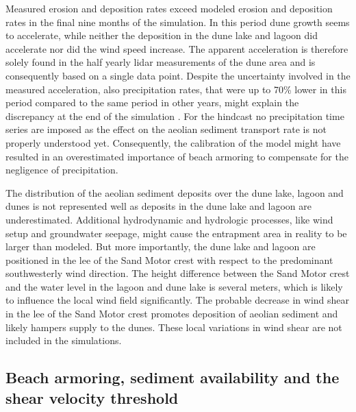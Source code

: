 Measured erosion and deposition rates exceed modeled erosion and
deposition rates in the final nine months of the simulation. In this
period dune growth seems to accelerate, while neither the deposition
in the dune lake and lagoon did accelerate nor did the wind speed
increase. The apparent acceleration is therefore solely found in the
half yearly lidar measurements of the dune area \citep{Hoonhout2017a}
and is consequently based on a single data point. Despite the
uncertainty involved in the measured acceleration, also precipitation
rates, that were up to 70\% lower in this period compared to the same
period in other years, might explain the discrepancy at the end of the
simulation \citep{Jackson1998}. For the hindcast no precipitation time
series are imposed as the effect on the aeolian sediment transport
rate is not properly understood yet. Consequently, the calibration of
the model might have resulted in an overestimated importance of beach
armoring to compensate for the negligence of precipitation.

The distribution of the aeolian sediment deposits over the dune lake,
lagoon and dunes is not represented well as deposits in the dune lake
and lagoon are underestimated. Additional hydrodynamic and hydrologic
processes, like wind setup and groundwater seepage, might cause the
entrapment area in reality to be larger than modeled. But more
importantly, the dune lake and lagoon are positioned in the lee of the
Sand Motor crest with respect to the predominant southwesterly wind
direction. The height difference between the Sand Motor crest and the
water level in the lagoon and dune lake is several meters, which is
likely to influence the local wind field significantly. The probable
decrease in wind shear in the lee of the Sand Motor crest promotes
deposition of aeolian sediment and likely hampers supply to the
dunes. These local variations in wind shear are not included in the
simulations.

\subsection{Beach armoring, sediment availability and the shear
  velocity threshold}


